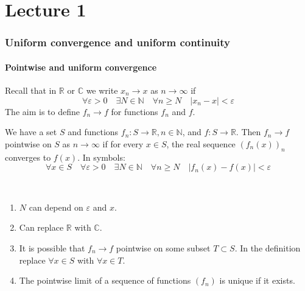 \documentclass[a4paper]{article}
\begin{document}
\maketitle
\tableofcontents
\newpage
\part*{Lecture 1}
\section{Uniform convergence and uniform continuity}
\subsection{Pointwise and uniform convergence}
Recall that in $\mathbb{R}$ or $\mathbb{C}$ we write $x_{n} \rightarrow x$ as $n \rightarrow \infty$ if
\[
\forall \varepsilon>0 \quad \exists N \in \mathbb{N} \quad \forall n \geqslant N \quad\left|x_{n}-x\right|<\varepsilon
\]
The aim is to define $f_{n} \rightarrow f$ for functions $f_{n}$ and $f$.

\begin{definition}
    We have a set $S$ and functions $f_{n}: S \rightarrow \mathbb{R}, n \in \mathbb{N}$, and $f: S \rightarrow \mathbb{R}$. Then $f_{n} \rightarrow f$ pointwise on $S$ as $n \rightarrow \infty$ if for every $x \in S$, the real sequence $\left(f_{n}(x)\right)_{n}$ converges to $f(x)$. In symbols:
    \[
    \forall x \in S \quad \forall \varepsilon>0 \quad \exists N \in \mathbb{N} \quad \forall n \geqslant N \quad\left|f_{n}(x)-f(x)\right|<\varepsilon
    \]
\end{definition}

\begin{remark}\
    \begin{enumerate}
        \item  $N$ can depend on $\varepsilon$ and $x$.
        \item Can replace $\mathbb{R}$ with $\mathbb{C}$.
        \item It is possible that $f_{n} \rightarrow f$ pointwise on some subset $T \subset S$. In the definition replace $\forall x \in S$ with $\forall x \in T$.
        \item The pointwise limit of a sequence of functions $(f_n)$ is unique if it exists.
    \end{enumerate}
\end{remark}
\end{document}
